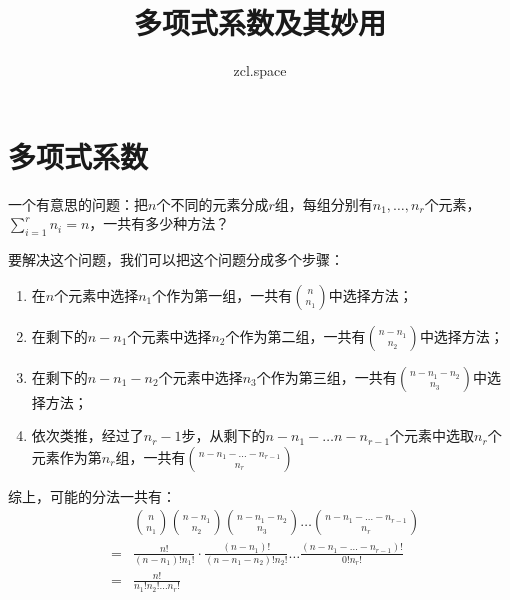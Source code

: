 \documentclass[10pt,a4paper,UTF8]{article}
\author{zcl.space}
\date{}
\title{多项式系数及其妙用}
\begin{document}
\maketitle
\tableofcontents
{}

\section{多项式系数}
\label{sec:org02149d0}


一个有意思的问题：把\(n\)个不同的元素分成\(r\)组，每组分别有\(n_{1},\ldots ,n_{r}\)个元素，\(\sum_{i=1}^{r}n_{i} = n\)，一共有多少种方法？

要解决这个问题，我们可以把这个问题分成多个步骤：
\begin{enumerate}
\item 在\(n\)个元素中选择\(n_{1}\)个作为第一组，一共有\(\binom{n}{n_{1}}\)中选择方法；
\item 在剩下的\(n-n_{1}\)个元素中选择\(n_2\)个作为第二组，一共有\(\binom{n-n_{1}}{n_{2}}\)中选择方法；
\item 在剩下的\(n-n_{1}-n_{2}\)个元素中选择\(n_{3}\)个作为第三组，一共有\(\binom{n-n_{1}-n_{2}}{n_{3}}\)中选择方法；
\item 依次类推，经过了\(n_{r}-1\)步，从剩下的\(n-n_{1} - \ldots n-n_{r-1}\)个元素中选取\(n_{r}\)个元素作为第\(n_{r}\)组，一共有\(\binom{n- n_{1} - \ldots - n_{r-1}}{n_{r}}\)
\end{enumerate}

综上，可能的分法一共有：
\begin{eqnarray}
\label{eq:3}
&&  \binom{n}{n_{1}}\binom{n-n_{1}}{n_{2}}\binom{n-n_{1}-n_{2}}{n_{3}} \ldots \binom{n- n_{1} - \ldots - n_{r-1}}{n_{r}}\\
&=& \frac{n!}{(n-n_{1})!n_{1}!} \cdot \frac{(n-n_{1})!}{(n-n_{1}- n_{2})!n_{2}!} \ldots \frac{(n-n_{1} - \ldots - n_{r-1})!}{0!n_{r}!}\\
&=& \frac{n!}{n_{1}!n_{2}!\ldots n_{r}!}
\end{eqnarray}
\end{document}

